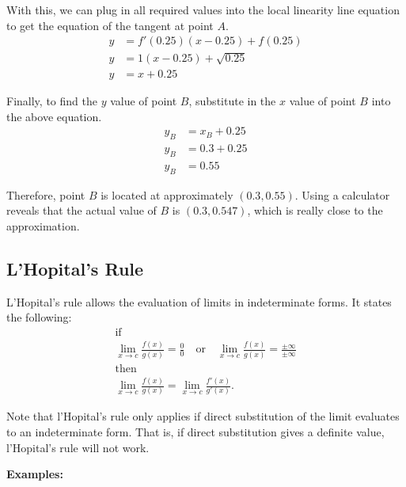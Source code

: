 \documentclass[12pt]{article}
\begin{document}
With this, we can plug in all required values into the local linearity line equation to get the equation of the tangent at point $A$.
\begin{align*}
	y &= f'(0.25) (x - 0.25) + f(0.25) \\
	y &= 1 (x - 0.25) + \sqrt{0.25} \\
	y &= x + 0.25
\end{align*}

Finally, to find the $y$ value of point $B$, substitute in the $x$ value of point $B$ into the above equation.
\begin{align*}
	y_B &= x_B + 0.25 \\
	y_B &= 0.3 + 0.25 \\
	y_B &= 0.55
\end{align*}

Therefore, point $B$ is located at approximately $(0.3, 0.55)$. Using a calculator reveals that the actual value of $B$ is $(0.3, 0.547)$, which is really close to the approximation.

\subsection{L'Hopital's Rule}
L'Hopital's rule allows the evaluation of limits in indeterminate forms. It states the following:
\begin{gather*}
	\text{if} \\
	\lim_{x \to c} \frac{f(x)}{g(x)} = \frac{0}{0} \quad \text{or} \quad \lim_{x \to c} \frac{f(x)}{g(x)} = \frac{\pm \infty}{\pm \infty} \\
	\text{then} \\
	\lim_{x \to c} \frac{f(x)}{g(x)} = \lim_{x \to c} \frac{f'(x)}{g'(x)}.
\end{gather*}

Note that l'Hopital's rule only applies if direct substitution of the limit evaluates to an indeterminate form. That is, if direct substitution gives a definite value, l'Hopital's rule will not work.

\noindent \textbf{Examples:}
\end{document}
